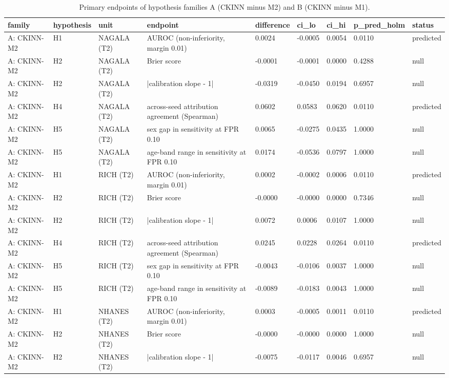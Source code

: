 \begin{table}[ht]
\centering
\scriptsize
\caption{Primary endpoints of hypothesis families A (CKINN minus M2) and B (CKINN minus M1).}
\label{tab:endpoints}
\begin{tabular}{lllllllll}
\toprule
family & hypothesis & unit & endpoint & difference & ci\_lo & ci\_hi & p\_pred\_holm & status \\
\midrule
A: CKINN-M2 & H1 & NAGALA (T2) & AUROC (non-inferiority, margin 0.01) & 0.0024 & -0.0005 & 0.0054 & 0.0110 & predicted \\
A: CKINN-M2 & H2 & NAGALA (T2) & Brier score & -0.0001 & -0.0001 & 0.0000 & 0.4288 & null \\
A: CKINN-M2 & H2 & NAGALA (T2) & |calibration slope - 1| & -0.0319 & -0.0450 & 0.0194 & 0.6957 & null \\
A: CKINN-M2 & H4 & NAGALA (T2) & across-seed attribution agreement (Spearman) & 0.0602 & 0.0583 & 0.0620 & 0.0110 & predicted \\
A: CKINN-M2 & H5 & NAGALA (T2) & sex gap in sensitivity at FPR 0.10 & 0.0065 & -0.0275 & 0.0435 & 1.0000 & null \\
A: CKINN-M2 & H5 & NAGALA (T2) & age-band range in sensitivity at FPR 0.10 & 0.0174 & -0.0536 & 0.0797 & 1.0000 & null \\
A: CKINN-M2 & H1 & RICH (T2) & AUROC (non-inferiority, margin 0.01) & 0.0002 & -0.0002 & 0.0006 & 0.0110 & predicted \\
A: CKINN-M2 & H2 & RICH (T2) & Brier score & -0.0000 & -0.0000 & 0.0000 & 0.7346 & null \\
A: CKINN-M2 & H2 & RICH (T2) & |calibration slope - 1| & 0.0072 & 0.0006 & 0.0107 & 1.0000 & null \\
A: CKINN-M2 & H4 & RICH (T2) & across-seed attribution agreement (Spearman) & 0.0245 & 0.0228 & 0.0264 & 0.0110 & predicted \\
A: CKINN-M2 & H5 & RICH (T2) & sex gap in sensitivity at FPR 0.10 & -0.0043 & -0.0106 & 0.0037 & 1.0000 & null \\
A: CKINN-M2 & H5 & RICH (T2) & age-band range in sensitivity at FPR 0.10 & -0.0089 & -0.0183 & 0.0043 & 1.0000 & null \\
A: CKINN-M2 & H1 & NHANES (T2) & AUROC (non-inferiority, margin 0.01) & 0.0003 & -0.0005 & 0.0011 & 0.0110 & predicted \\
A: CKINN-M2 & H2 & NHANES (T2) & Brier score & -0.0000 & -0.0000 & 0.0000 & 1.0000 & null \\
A: CKINN-M2 & H2 & NHANES (T2) & |calibration slope - 1| & -0.0075 & -0.0117 & 0.0046 & 0.6957 & null \\

\end{tabular}
\end{table}
